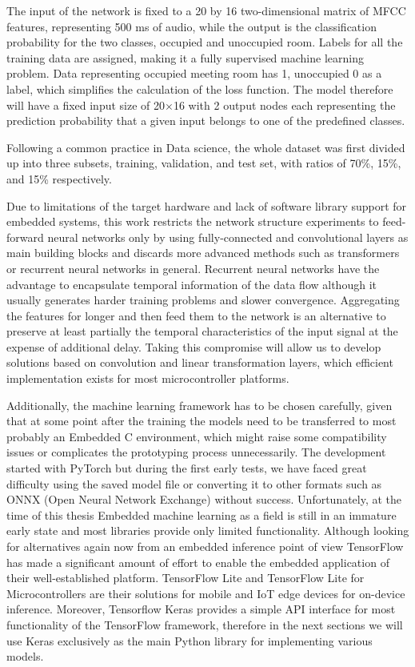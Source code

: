 The input of the network is fixed to a 20 by 16 two-dimensional matrix of MFCC features, representing 500 ms of audio, while the output is the classification probability for the two classes, occupied and unoccupied room. Labels for all the training data are assigned, making it a fully supervised machine learning problem. Data representing occupied meeting room has 1, unoccupied 0 as a label, which simplifies the calculation of the loss function. The model therefore will have a fixed input size of 20$\times$16 with 2 output nodes each representing the prediction probability that a given input belongs to one of the predefined classes. 

Following a common practice in Data science, the whole dataset was first divided up into three subsets, training, validation, and test set, with ratios of 70\%, 15\%, and 15\% respectively.


Due to limitations of the target hardware and lack of software library support for embedded systems, this work restricts the network structure experiments to feed-forward neural networks only by using fully-connected and convolutional layers as main building blocks and discards more advanced methods such as transformers or recurrent neural networks in general. Recurrent neural networks have the advantage to encapsulate temporal information of the data flow although it usually generates harder training problems and slower convergence. Aggregating the features for longer and then feed them to the network is an alternative to preserve at least partially the temporal characteristics of the input signal at the expense of additional delay. Taking this compromise will allow us to develop solutions based on convolution and linear transformation layers, which efficient implementation exists for most microcontroller platforms.

Additionally, the machine learning framework has to be chosen carefully, given that at some point after the training the models need to be transferred to most probably an Embedded C environment, which might raise some compatibility issues or complicates the prototyping process unnecessarily. The development started with PyTorch \cite{NEURIPS2019Pytorch} but during the first early tests, we have faced great difficulty using the saved model file or converting it to other formats such as ONNX (Open Neural Network Exchange) \cite{bai2019onnx} without success. Unfortunately, at the time of this thesis Embedded machine learning as a field is still in an immature early state and most libraries provide only limited functionality. Although looking for alternatives again now from an embedded inference point of view TensorFlow \cite{tensorflow2015-whitepaper} has made a significant amount of effort to enable the embedded application of their well-established platform. TensorFlow Lite and TensorFlow Lite for Microcontrollers are their solutions for mobile and IoT edge devices for on-device inference. Moreover, Tensorflow Keras \cite{chollet2015keras} provides a simple API interface for most functionality of the TensorFlow framework, therefore in the next sections we will use Keras exclusively as the main Python library for implementing various models.

